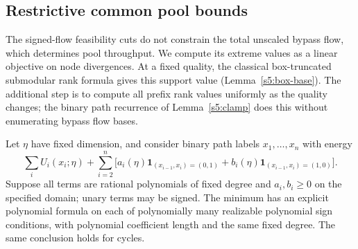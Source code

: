 \subsection{Restrictive common pool bounds}\label{s5:common-capacity}

The signed-flow feasibility cuts do not constrain the total unscaled
bypass flow, which determines pool throughput. We compute its extreme values
as a linear objective on node divergences. At a fixed quality, the classical
box-truncated submodular rank formula gives this support value
(Lemma~\ref{s5:box-base}). The additional step is to compute all prefix rank values
uniformly as the quality changes; the binary path recurrence of
Lemma~\ref{s5:clamp} does this without enumerating bypass flow bases.

\begin{lemma}
\label{s5:clamp}
Let $\eta$ have fixed dimension, and consider binary path labels
$x_1,\ldots,x_n$ with energy
\[
 \sum_iU_i(x_i;\eta)+\sum_{i=2}^n
 \bigl[a_i(\eta)\mathbf1_{(x_{i-1},x_i)=(0,1)}+
       b_i(\eta)\mathbf1_{(x_{i-1},x_i)=(1,0)}\bigr].
\]
Suppose all terms are rational polynomials of fixed degree and
$a_i,b_i\ge0$ on the specified domain; unary terms may be signed.
The minimum has an explicit polynomial formula on each of polynomially
many realizable polynomial sign conditions, with polynomial coefficient
length and the same fixed degree. The same conclusion holds for cycles.
\end{lemma}
